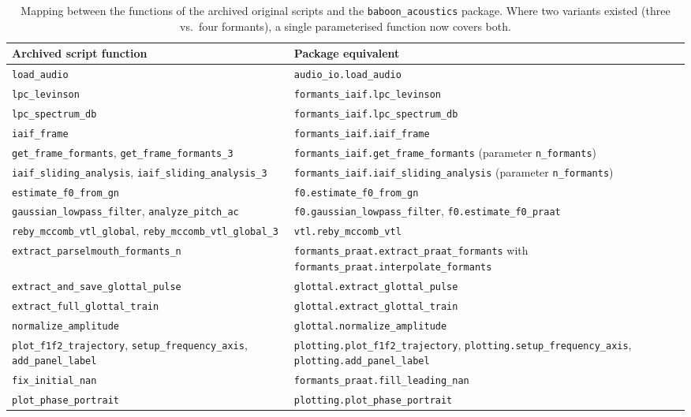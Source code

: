 \documentclass[11pt,a4paper]{article}
\newcommand{\file}[1]{\texttt{#1}}
\newcommand{\pkg}{\texttt{baboon\_acoustics}}
\begin{document}
\begin{table}[h]
\centering\footnotesize
\begin{tabular}{@{}>{\raggedright\arraybackslash}p{}>{\raggedright\arraybackslash}p{}@{}}
\toprule
Archived script function & Package equivalent \\
\midrule
\file{load\_audio} & \file{audio\_io.load\_audio} \\
\file{lpc\_levinson} & \file{formants\_iaif.lpc\_levinson} \\
\file{lpc\_spectrum\_db} & \file{formants\_iaif.lpc\_spectrum\_db} \\
\file{iaif\_frame} & \file{formants\_iaif.iaif\_frame} \\
\file{get\_frame\_formants}, \file{get\_frame\_formants\_3} & \file{formants\_iaif.get\_frame\_formants} (parameter \file{n\_formants}) \\
\file{iaif\_sliding\_analysis}, \file{iaif\_sliding\_analysis\_3} & \file{formants\_iaif.iaif\_sliding\_analysis} (parameter \file{n\_formants}) \\
\file{estimate\_f0\_from\_gn} & \file{f0.estimate\_f0\_from\_gn} \\
\file{gaussian\_lowpass\_filter}, \file{analyze\_pitch\_ac} & \file{f0.gaussian\_lowpass\_filter}, \file{f0.estimate\_f0\_praat} \\
\file{reby\_mccomb\_vtl\_global}, \file{reby\_mccomb\_vtl\_global\_3} & \file{vtl.reby\_mccomb\_vtl} \\
\file{extract\_parselmouth\_formants\_n} & \file{formants\_praat.extract\_praat\_formants} with \file{formants\_praat.interpolate\_formants} \\
\file{extract\_and\_save\_glottal\_pulse} & \file{glottal.extract\_glottal\_pulse} \\
\file{extract\_full\_glottal\_train} & \file{glottal.extract\_glottal\_train} \\
\file{normalize\_amplitude} & \file{glottal.normalize\_amplitude} \\
\file{plot\_f1f2\_trajectory}, \file{setup\_frequency\_axis}, \file{add\_panel\_label} & \file{plotting.plot\_f1f2\_trajectory}, \file{plotting.setup\_frequency\_axis}, \file{plotting.add\_panel\_label} \\
\file{fix\_initial\_nan} & \file{formants\_praat.fill\_leading\_nan} \\
\file{plot\_phase\_portrait} & \file{plotting.plot\_phase\_portrait} \\
\bottomrule
\end{tabular}
\caption{Mapping between the functions of the archived original scripts
and the \pkg{} package. Where two variants existed (three vs.\ four
formants), a single parameterised function now covers both.}
\label{tab:mapping}
\end{table}
\end{document}

